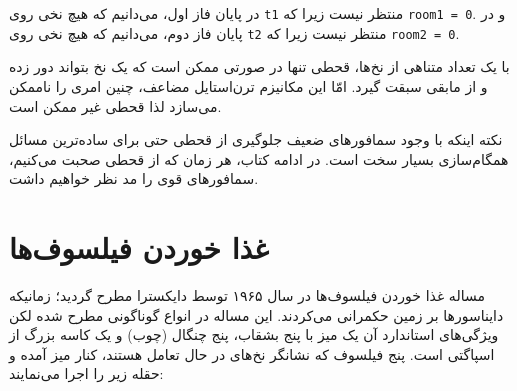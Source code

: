 \documentclass{book}
\newcommand{\clearemptydoublepage}{\newpage\cleardoublepage}
\begin{document}
    در پایان فاز اول، می‌دانیم که هیچ نخی روی  {\tt t1} منتظر نیست زیرا که {\tt room1 = 0}.
    و در پایان فاز دوم، می‌دانیم که هیچ نخی روی {\tt t2} منتظر نیست زیرا که {\tt room2 = 0}. 

    با یک تعداد متناهی از نخ‌ها، قحطی تنها در صورتی ممکن است که یک نخ بتواند دور زده و از مابقی سبقت گیرد.
    امّا این مکانیزم ترن‌استایل مضاعف، چنین امری را ناممکن می‌سازد لذا قحطی غیر ممکن است. 

    نکته اینکه با وجود سمافورهای ضعیف جلوگیری از قحطی حتی برای ساده‌ترین مسائل همگام‌سازی بسیار سخت است.
    در ادامه کتاب، هر زمان که از قحطی صحبت می‌کنیم، سمافورهای قوی را مد نظر خواهیم داشت. 


\clearemptydoublepage
\section
{غذا خوردن فیلسوف‌ها}
\label{dining}

    مساله غذا خوردن فیلسوف‌ها در سال ۱۹۶۵ توسط دایکسترا مطرح گردید؛ زمانیکه دایناسورها بر زمین حکمرانی می‌کردند\cite{dijkstra65}. 
    این مساله در انواع گوناگونی مطرح شده لکن ویژگی‌های استاندارد آن یک میز با پنج بشقاب، پنج چنگال (چوب) و یک کاسه بزرگ از اسپاگتی است. 
    پنج فیلسوف که نشانگر نخ‌های در حال تعامل هستند، کنار میز آمده و حقله زیر را اجرا می‌نمایند: 
    
\end{document}
